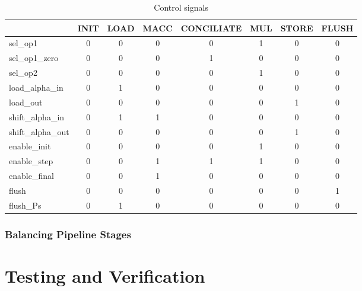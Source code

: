 \documentclass[mscthesis]{usiinfthesis}
\begin{document}
\begin{table}[h]
    \begin{center}
    \begin{tabular}{|l|c|c|c|c|c|c|c|}
    \hline
                      & INIT & LOAD & MACC & CONCILIATE & MUL & STORE & FLUSH \\
    \hline
    sel\_op1          & 0    & 0    & 0    & 0          & 1   & 0     & 0     \\
    sel\_op1\_zero    & 0    & 0    & 0    & 1          & 0   & 0     & 0     \\
    sel\_op2          & 0    & 0    & 0    & 0          & 1   & 0     & 0     \\
    load\_alpha\_in   & 0    & 1    & 0    & 0          & 0   & 0     & 0     \\
    load\_out         & 0    & 0    & 0    & 0          & 0   & 1     & 0     \\
    shift\_alpha\_in  & 0    & 1    & 1    & 0          & 0   & 0     & 0     \\
    shift\_alpha\_out & 0    & 0    & 0    & 0          & 0   & 1     & 0     \\
    enable\_init      & 0    & 0    & 0    & 0          & 1   & 0     & 0     \\
    enable\_step      & 0    & 0    & 1    & 1          & 1   & 0     & 0     \\
    enable\_final     & 0    & 0    & 1    & 0          & 0   & 0     & 0     \\
    flush             & 0    & 0    & 0    & 0          & 0   & 0     & 1     \\
    flush\_Ps         & 0    & 1    & 0    & 0          & 0   & 0     & 0     \\
    \hline
    \end{tabular}
    \end{center}
    \caption{Control signals}
    \label{tab:ctrl}
\end{table}

\subsection{Balancing Pipeline Stages}

\chapter{Testing and Verification}
\label{ch:test}
\end{document}
